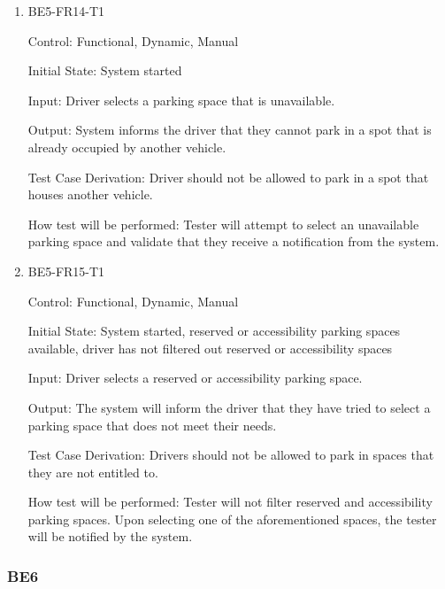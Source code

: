 \documentclass[12pt, titlepage]{article}
\begin{document}
\begin{enumerate}

\item{BE5-FR14-T1}

Control: Functional, Dynamic, Manual
					
Initial State: System started 
					
Input: Driver selects a parking space that is unavailable.
					
Output: System informs the driver that they cannot park in a spot that is
already occupied by another vehicle.

Test Case Derivation: Driver should not be allowed to park in a spot that houses
another vehicle.
					
How test will be performed: Tester will attempt to select an unavailable parking
space and validate that they receive a notification from the system.

\item{BE5-FR15-T1}

Control: Functional, Dynamic, Manual
					
Initial State: System started, reserved or accessibility parking spaces
available, driver has not filtered out reserved or accessibility spaces
					
Input: Driver selects a reserved or accessibility parking space.
					
Output: The system will inform the driver that they have tried to select a
parking space that does not meet their needs. 

Test Case Derivation: Drivers should not be allowed to park in spaces that they
are not entitled to.
					
How test will be performed: Tester will not filter reserved and accessibility
parking spaces. Upon selecting one of the aforementioned spaces, the tester will
be notified by the system.

\end{enumerate}

\subsubsection{BE6}
\end{document}

